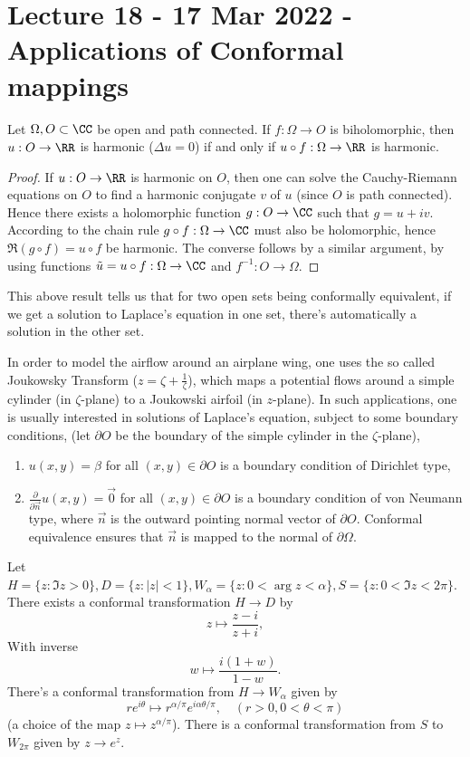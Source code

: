\section{Lecture 18 - 17 Mar 2022 - Applications of Conformal mappings}
\begin{proposition}
  Let $\Omega, O\subset\CC$ be open and path connected. If $f:\Omega\to O$ is
  biholomorphic, then $u:O\to \RR$ is harmonic ($\Delta u=0$) if and only if $u\circ
  f:\Omega\to\RR$ is harmonic.
  \label{prop:}
\end{proposition}
\begin{proof}
  If $u:O\to\RR$ is harmonic on $O$, then one can solve the Cauchy-Riemann
  equations on $O$ to find a harmonic conjugate $v$ of $u$ (since $O$ is path
  connected). Hence there exists a holomorphic function $g:O\to\CC$ such that
  $g=u+iv$. According to the chain rule $g\circ f: \Omega\to\CC$ must also be
  holomorphic, hence $\Re(g\circ f) = u\circ f$ be harmonic. The converse
  follows by a similar argument, by using functions $\tilde{u}=u\circ f:
  \Omega\to\CC$ and $f^{-1}:O\to\Omega$.
\end{proof}
This above result tells us that for two open sets being conformally equivalent,
if we get a solution to Laplace's equation in one set, there's automatically a
solution in the other set.
\begin{example}
  In order to model the airflow around an airplane wing, one uses the so called
  Joukowsky Transform ($z=\zeta+ \frac{1}{\zeta}$), which maps a potential flows
  around a simple cylinder (in $\zeta$-plane) to a Joukowski airfoil (in
  $z$-plane). In such applications, one is usually interested in solutions of
  Laplace's equation, subject to some boundary conditions, (let $\partial O$ be
  the boundary of the simple cylinder in the $\zeta$-plane),
  \begin{enumerate}
    \item $u(x,y)= \beta$ for all $(x,y)\in\partial O$ is a boundary condition of
      Dirichlet type,
    \item $\frac{\partial}{\partial \vec{n}} u(x,y) = \vec{0}$ for all
      $(x,y)\in\partial O$ is a boundary condition of von Neumann type, where
      $\vec{n}$ is the outward pointing normal vector of $\partial O$. Conformal
      equivalence ensures that $\vec{n}$ is mapped to the normal of $\partial
      \Omega$.
  \end{enumerate} 
\end{example}
\begin{example}
  Let $H=\{z: \Im z> 0\}, D=\{z: |z|<1\}, W_{\alpha}=\{z: 0<\arg z< \alpha\},
  S=\{z: 0< \Im z < 2\pi\}$. There exists a conformal transformation $H\to D$ by 
  \[z\mapsto \frac{z-i}{z+i},\]
  With inverse
  \[w\mapsto \frac{i(1+w)}{1-w}.\]
  There's a conformal transformation from $H\to W_{\alpha}$ given by
  \[re^{i\theta}\mapsto r^{\alpha/\pi} e^{i\alpha\theta/\pi}, \quad (r>0,
  0<\theta<\pi)\]
  (a choice of the map $z\mapsto z^{\alpha/\pi}$). There is a conformal
  transformation from $S$ to $W_{2\pi}$ given by $z\to e^{z}$.
\end{example}

